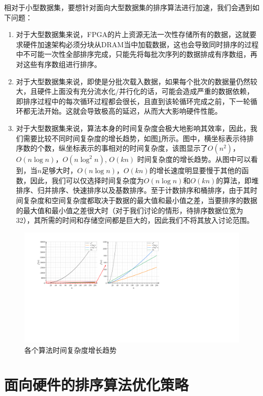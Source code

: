 相对于小型数据集，要想针对面向大型数据集的排序算法进行加速，我们会遇到如下问题：
\begin{enumerate}
    \item 对于大型数据集来说，FPGA的片上资源无法一次性存储所有的数据，这就要求硬件加速架构必须分块从DRAM当中加载数据，这也会导致同时排序的过程中不可能一次性全部排序完成，只能先将每批次序列的数据排成有序数组，再对这些有序数组进行排序。
    \item 对于大型数据集来说，即使是分批次载入数据，如果每个批次的数据量仍然较大，且硬件上面没有充分流水化/并行化的话，可能会造成严重的数据依赖，即排序过程中的每次循环过程都会很长，且直到该轮循环完成之前，下一轮循环都无法开始。这就会导致极高的延迟，从而大大影响硬件性能。
    \item 对于大型数据集来说，算法本身的时间复杂度会极大地影响其效率，因此，我们需要比较不同时间复杂度的增长趋势，如图\ref{fig:time complexity}所示。图中，横坐标表示待排序数的个数，纵坐标表示的事相对的时间复杂度，该图显示了$O(n^2)$，$O(n\log n)$，$O(n\log^2n)$, $O(kn)$ 时间复杂度的增长趋势。从图中可以看到，当$n$足够大时，$O(n\log n)$，$O(kn)$的增长速度明显要慢于其他的函数，因此，我们可以仅选择时间复杂度为$O(n\log n)$和$O(kn)$的算法，即堆排序、归并排序、快速排序以及基数排序。至于计数排序和桶排序，由于其时间复杂度和空间复杂度都取决于数据的最大值和最小值之差，当要排序的数据的最大值和最小值之差很大时（对于我们讨论的情形，待排序数据位宽为32），其所需的时间和存储空间都是巨大的，因此我们不将其放入讨论范围。
\end{enumerate}
\begin{figure}[htbp]
    \centering
    \includegraphics[width=\linewidth]{figures/time complexity.pdf}
    \caption{各个算法时间复杂度增长趋势}
    \label{fig:time complexity}
\end{figure}


\section{面向硬件的排序算法优化策略}

